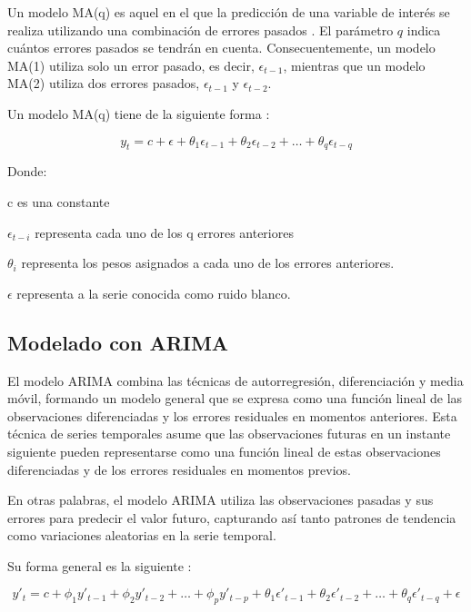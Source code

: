 Un modelo MA(q) es aquel en el que la predicción de una variable de interés se realiza utilizando una combinación de errores pasados \cite{hyndman}. El parámetro $q$ indica cuántos errores pasados se tendrán en cuenta. Consecuentemente, un modelo MA(1) utiliza solo un error pasado, es decir, $\epsilon_{t-1}$, mientras que un modelo MA(2) utiliza dos errores pasados, $\epsilon_{t-1}$ y $\epsilon_{t-2}$.

Un modelo MA(q) tiene de la siguiente forma \cite{hyndman}:

\begin{equation}
y_t = c + \epsilon + \theta_1 \epsilon_{t-1} + \theta_2 \epsilon_{t-2} + \dots + \theta_q \epsilon_{t-q}
\label{eq:movingaverage}
\end{equation}

Donde:

c es una constante

\(\epsilon_{t-i}\) representa cada uno de los q errores anteriores

\(\theta_{i}\) representa los pesos asignados a cada uno de los errores anteriores.

\(\epsilon\) representa a la serie conocida como ruido blanco.


\subsection{Modelado con ARIMA}

El modelo ARIMA combina las técnicas de autorregresión, diferenciación y media móvil, formando un modelo general que se expresa como una función lineal de las observaciones diferenciadas y los errores residuales en momentos anteriores. Esta técnica de series temporales asume que las observaciones futuras en un instante siguiente pueden representarse como una función lineal de estas observaciones diferenciadas y de los errores residuales en momentos previos.

En otras palabras, el modelo ARIMA utiliza las observaciones pasadas y sus errores para predecir el valor futuro, capturando así tanto patrones de tendencia como variaciones aleatorias en la serie temporal. 

Su forma general es la siguiente \cite{hyndman}:

\begin{equation}
y'_t = c + \phi_1 y'_{t-1} + \phi_2 y'_{t-2} + \dots + \phi_p y'_{t-p} + \theta_1 \epsilon'_{t-1} + \theta_2 \epsilon'_{t-2} + \dots + \theta_q \epsilon'_{t-q} + \epsilon
\label{eq:ARIMA}
\end{equation}

